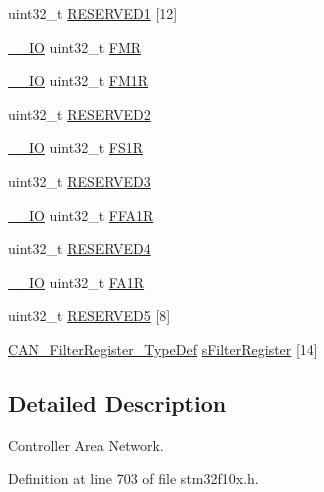 \begin{DoxyCompactItemize}
\item 
uint32\+\_\+t \hyperlink{struct_c_a_n___type_def_a046ef464378aaaaafaf999c23a4dc55e}{R\+E\+S\+E\+R\+V\+E\+D1} \mbox{[}12\mbox{]}
\item 
\hyperlink{core__sc300_8h_aec43007d9998a0a0e01faede4133d6be}{\+\_\+\+\_\+\+IO} uint32\+\_\+t \hyperlink{struct_c_a_n___type_def_a1a6a0f78ca703a63bb0a6b6f231f612f}{F\+MR}
\item 
\hyperlink{core__sc300_8h_aec43007d9998a0a0e01faede4133d6be}{\+\_\+\+\_\+\+IO} uint32\+\_\+t \hyperlink{struct_c_a_n___type_def_aefe6a26ee25947b7eb5be9d485f4d3b0}{F\+M1R}
\item 
uint32\+\_\+t \hyperlink{struct_c_a_n___type_def_ab29069c9fd10eeec47414abd8d06822f}{R\+E\+S\+E\+R\+V\+E\+D2}
\item 
\hyperlink{core__sc300_8h_aec43007d9998a0a0e01faede4133d6be}{\+\_\+\+\_\+\+IO} uint32\+\_\+t \hyperlink{struct_c_a_n___type_def_ac6296402924b37966c67ccf14a381976}{F\+S1R}
\item 
uint32\+\_\+t \hyperlink{struct_c_a_n___type_def_af730af32307f845895465e8ead57d20c}{R\+E\+S\+E\+R\+V\+E\+D3}
\item 
\hyperlink{core__sc300_8h_aec43007d9998a0a0e01faede4133d6be}{\+\_\+\+\_\+\+IO} uint32\+\_\+t \hyperlink{struct_c_a_n___type_def_ae2decd14b26f851e00a31b42d15293ce}{F\+F\+A1R}
\item 
uint32\+\_\+t \hyperlink{struct_c_a_n___type_def_a51c408c7c352b8080f0c6d42bf811d43}{R\+E\+S\+E\+R\+V\+E\+D4}
\item 
\hyperlink{core__sc300_8h_aec43007d9998a0a0e01faede4133d6be}{\+\_\+\+\_\+\+IO} uint32\+\_\+t \hyperlink{struct_c_a_n___type_def_ab57a3a6c337a8c6c7cb39d0cefc2459a}{F\+A1R}
\item 
uint32\+\_\+t \hyperlink{struct_c_a_n___type_def_ad4339975b6064cfe2aaeb642f916d6e0}{R\+E\+S\+E\+R\+V\+E\+D5} \mbox{[}8\mbox{]}
\item 
\hyperlink{struct_c_a_n___filter_register___type_def}{C\+A\+N\+\_\+\+Filter\+Register\+\_\+\+Type\+Def} \hyperlink{struct_c_a_n___type_def_ab8ad52d839d4bcea4ce3502a4d279ff1}{s\+Filter\+Register} \mbox{[}14\mbox{]}
\end{DoxyCompactItemize}


\subsection{Detailed Description}
Controller Area Network. 

Definition at line 703 of file stm32f10x.\+h.



